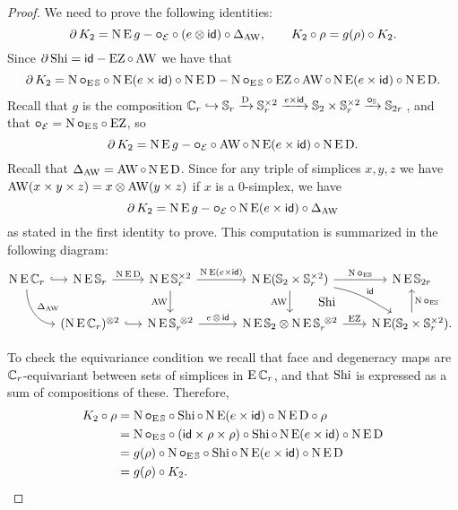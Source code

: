 \begin{proof}
	We need to prove the following identities:
	\[
	\bd K_2 = \chains\EE g - \bcomp_{\BE} \comp (e \ot \id) \comp \Delta_{\AW},
	\qquad
	K_2 \comp \rho = g(\rho) \comp K_2.
	\]
	Since $\bd \Shi = \id - \EZ \comp \AW$ we have that
	\[
	\bd K_2 =
	\chains\bcomp_{\EE\sym} \comp \chains\EE(e \times \id) \comp \chains\EE\rD -
	\chains\bcomp_{\EE\sym} \comp \EZ \comp \AW \comp \chains\EE(e \times \id) \comp \chains\EE\rD.
	\]
	Recall that $g$ is the composition $\cyc_r \hookrightarrow \sym_r \xra{\rD} \sym_r^{\times 2} \xra{e \times \id} \sym_2 \times \sym_r^{\times 2} \xra{\bcomp_{\sym}} \sym_{2r}$\,, and that $\bcomp_{\BE} = \chains\bcomp_{\EE\sym} \comp \EZ$, so
	\[
	\bd K_2 =
	\chains\EE g -
	\bcomp_{\BE} \comp \AW \comp \chains\EE(e \times \id) \comp \chains\EE\rD.
	\]
	Recall that $\Delta_{\AW} = \AW \comp \chains\EE\rD$.
	Since for any triple of simplices $x,y,z$ we have $\AW(x \times y \times z) = x \ot \AW(y \times z)$ if $x$ is a $0$-simplex, we have
	\[
	\bd K_2 =
	\chains\EE g -
	\bcomp_{\BE} \comp \chains\EE(e \times \id) \comp \Delta_{\AW}
	\]
	as stated in the first identity to prove.
	This computation is summarized in the following diagram:
	\[
	\hspace*{-4pt}
	\begin{tikzcd}
		\chains\EE\cyc_r
		\rar[hook]
		\arrow[dr,in=180,out=-90,"\Delta_{\AW}"]
		&[-20pt]
		\chains\EE\sym_r
		\rar["\chains\EE\rD"] &[-10pt]
		\chains\EE\sym_r^{\times 2}
		\rar["\chains\EE(e \times \id)"]
		\dar["\AW"'] &[7pt]
		\chains\EE(\sym_2 \times \sym_r^{\times 2})
		\rar["\chains\bcomp_{\EE\!\sym}"]
		\dar["\AW"']
		\drar["\id",out=-10,in=150] &[-5pt]
		\chains\EE\sym_{2r} \\ &
		(\chains\EE\cyc_r)^{\ot 2}
		\arrow[r,hook] &
		\chains\EE\sym_r^{\ \ot 2}
		\rar["e \,\ot\, \id"] &
		\chains\EE\sym_2 \ot \chains\EE\sym_r^{\ \ot 2}
		\rar["\EZ"]
		\uar["\Shi",phantom,shift right=30pt] &
		\chains\EE(\sym_2 \times \sym_r^{\times 2}).
		\uar["\chains\bcomp_{\EE\!\sym}"']
	\end{tikzcd}
	\]

	To check the equivariance condition we recall that face and degeneracy maps are $\cyc_r$-equivariant between sets of simplices in $\EE\cyc_r$, and that $\Shi$ is expressed as a sum of compositions of these.
	Therefore,
	\begin{align*}
		K_2 \comp \rho &=
		\chains\bcomp_{\EE\sym} \comp \Shi \comp \chains\EE(e \times \id) \comp \chains\EE\rD \comp \rho \\ &=
		\chains\bcomp_{\EE\sym} \comp (\id \times \rho \times \rho) \comp \Shi \comp \chains\EE(e \times \id) \comp \chains\EE\rD \\ &=
		g(\rho) \comp \chains\bcomp_{\EE\sym} \comp \Shi \comp \chains\EE(e \times \id) \comp \chains\EE\rD \\ &=
		g(\rho) \comp K_2. \qedhere
	\end{align*}
\end{proof}

